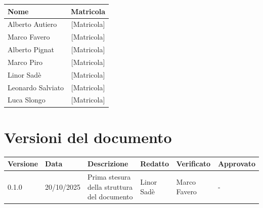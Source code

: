 \documentclass[a4paper,12pt]{article}
\newcommand{\CurrentVersion}{0.1.0} %
\begin{document}
\vspace{0.5cm}

\begin{center}
\begin{tcolorbox}[colback=lightgray,colframe=primaryblue,width=0.85\textwidth,arc=3mm,boxrule=0.5pt,title={\bfseries Il team BugBusters}]
\begin{center}
\begin{tabular}{lc}
\toprule
\textbf{Nome} & \textbf{Matricola} \\
\midrule
Alberto Autiero & {[Matricola]} \\
Marco Favero & {[Matricola]} \\
Alberto Pignat & {[Matricola]} \\
Marco Piro & {[Matricola]} \\
Linor Sadè & {[Matricola]} \\
Leonardo Salviato & {[Matricola]} \\
Luca Slongo & {[Matricola]} \\
\bottomrule
\end{tabular}
\end{center}
\end{tcolorbox}
\end{center}

\vspace{1cm}

\section{Versioni del documento}
{\footnotesize
\begin{tabularx}{\textwidth}{|p{1.5cm}|p{2cm}|X|p{2cm}|p{2cm}|p{2cm}|}
\hline
\textbf{Versione} & \textbf{Data} & \textbf{Descrizione} & \textbf{Redatto} & \textbf{Verificato} & \textbf{Approvato} \\
\hline
\CurrentVersion & 20/10/2025 & Prima stesura della struttura del documento & Linor Sadè & Marco Favero & - \\
\hline
\end{tabularx}
}

\newpage

\renewcommand{\cftsecpagefont}{\normalfont}
\renewcommand{\cftsecleader}{\cftdotfill{\cftsecdotsep}}
\setlength{\cftbeforesecskip}{2pt}
\begin{center}
\begin{tcolorbox}[colback=lightgray,colframe=darkgray,width=0.9\textwidth,arc=2mm,boxrule=0.5pt]
\tableofcontents
\end{tcolorbox}
\end{center}
\end{document}
